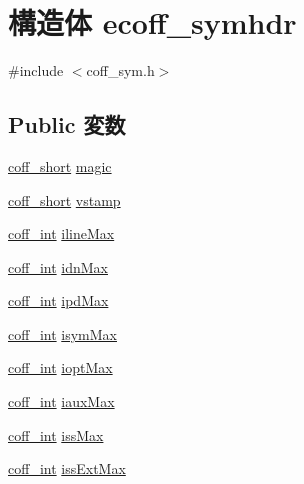\hypertarget{structecoff__symhdr}{
\section{構造体 ecoff\_\-symhdr}
\label{structecoff__symhdr}
}


{\ttfamily \#include $<$coff\_\-sym.h$>$}\subsection*{Public 変数}
\begin{DoxyCompactItemize}
\item 
\hyperlink{ecoff__machdep_8h_a5a92a17f14ada2d4b7be26c46466b871}{coff\_\-short} \hyperlink{structecoff__symhdr_a805a601a601ae911a002e031aba5a017}{magic}
\item 
\hyperlink{ecoff__machdep_8h_a5a92a17f14ada2d4b7be26c46466b871}{coff\_\-short} \hyperlink{structecoff__symhdr_ac5b7916498751eb0e1d3258a379d2dd9}{vstamp}
\item 
\hyperlink{ecoff__machdep_8h_a484fbe8ab04f62e9ac2341a8275f3c35}{coff\_\-int} \hyperlink{structecoff__symhdr_ad690459ca5ec6247f7896815e8d919f2}{ilineMax}
\item 
\hyperlink{ecoff__machdep_8h_a484fbe8ab04f62e9ac2341a8275f3c35}{coff\_\-int} \hyperlink{structecoff__symhdr_a00f574ac9555f934729d8ded2ca46e61}{idnMax}
\item 
\hyperlink{ecoff__machdep_8h_a484fbe8ab04f62e9ac2341a8275f3c35}{coff\_\-int} \hyperlink{structecoff__symhdr_acd426cdfa49e9a962feea26a7237970d}{ipdMax}
\item 
\hyperlink{ecoff__machdep_8h_a484fbe8ab04f62e9ac2341a8275f3c35}{coff\_\-int} \hyperlink{structecoff__symhdr_ae7269aaf3a4d674454f94748a014fe61}{isymMax}
\item 
\hyperlink{ecoff__machdep_8h_a484fbe8ab04f62e9ac2341a8275f3c35}{coff\_\-int} \hyperlink{structecoff__symhdr_a5e2bdfe0cdc41e7425a2704cb9651b04}{ioptMax}
\item 
\hyperlink{ecoff__machdep_8h_a484fbe8ab04f62e9ac2341a8275f3c35}{coff\_\-int} \hyperlink{structecoff__symhdr_a86c16e4bd3790264fb662eef896efcac}{iauxMax}
\item 
\hyperlink{ecoff__machdep_8h_a484fbe8ab04f62e9ac2341a8275f3c35}{coff\_\-int} \hyperlink{structecoff__symhdr_a5637fa1af56ff0c6e719d0e6e4b77457}{issMax}
\item 
\hyperlink{ecoff__machdep_8h_a484fbe8ab04f62e9ac2341a8275f3c35}{coff\_\-int} \hyperlink{structecoff__symhdr_a9b259532c92b5c7a93472107d0c6f507}{issExtMax}

\end{DoxyCompactItemize}
